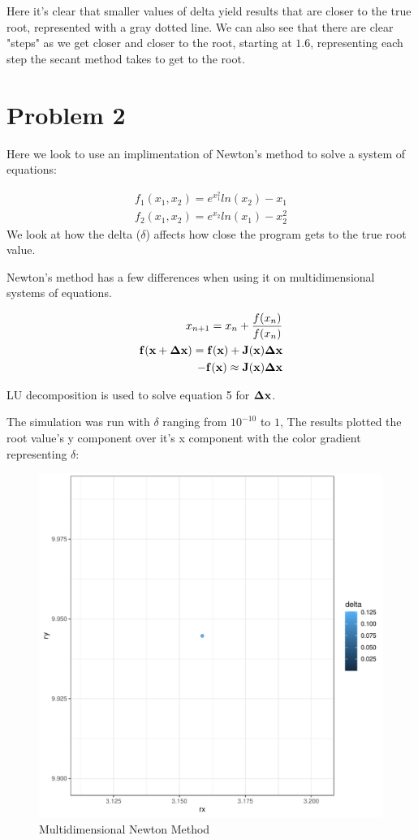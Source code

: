 \documentclass[prb,twocolumn]{revtex4-2}
\begin{document}
Here it's clear that smaller values of delta yield results that are closer to the true root, represented with a gray dotted line. We can also see that there are clear "steps" as we get closer and closer to the root, starting at $1.6$, representing each step the secant method takes to get to the root.

\section{Problem 2}

Here we look to use an implimentation of Newton's method to solve a system of equations:

\begin{eqnarray}
f_1(x_1,x_2)=e^{x_1^2}ln(x_2)-x_1 \\
f_2(x_1,x_2)=e^{x_2}ln(x_1)-x_2^2
\label{namefornewequation}
\end{eqnarray}
We look at how the delta ($\delta$) affects how close the program gets to the true root value.

Newton's method has a few differences when using it on multidimensional systems of equations.

\begin{eqnarray}
x_{n+1}=x_n+\frac{f(x_n)}{f(x_n)} \\
\bold{f(x+\Delta x)}=\bold{f(x)}+\bold{J(x)\Delta x} \\
-\bold{f(x)}\approx\bold{J(x)\Delta x}
\label{namefornewequation}
\end{eqnarray}

LU decomposition is used to solve equation 5 for $\bold{\Delta x}$.


The simulation was run with $\delta$ ranging from $10^{-10}$ to $1$, The results plotted the root value's y component over it's x component with the color gradient representing $\delta$:

\begin{figure}[h!]
\centerline{\includegraphics [width=3 in] {newton}} \caption{Multidimensional Newton Method} \label{newton}
\end{figure}
\end{document}
